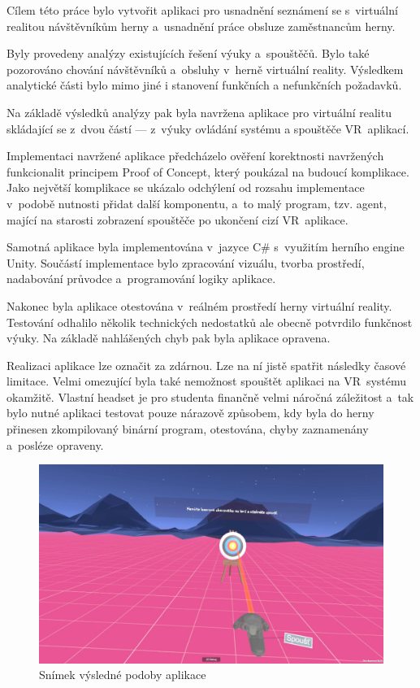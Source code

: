 Cílem této práce bylo vytvořit aplikaci pro usnadnění seznámení se
s~virtuální realitou návštěvníkům herny a~usnadnění práce obsluze zaměstnancům herny.

Byly provedeny analýzy existujících řešení výuky a~spouštěčů. Bylo také
pozorováno chování návštěvníků a~obsluhy v~herně virtuální reality.
Výsledkem analytické části bylo mimo jiné i stanovení funkčních a
nefunkčních požadavků.

Na základě výsledků analýzy pak byla navržena aplikace pro virtuální
realitu skládající se z~dvou částí --- z~výuky ovládání systému a
spouštěče VR~aplikací.

Implementaci navržené aplikace předcházelo ověření korektnosti
navržených funkcionalit principem Proof of Concept, který poukázal na
budoucí komplikace. Jako největší komplikace se ukázalo odchýlení od
rozsahu implementace v~podobě nutnosti přidat další komponentu, a~to
malý program, tzv. agent, mající na starosti zobrazení spouštěče po
ukončení cizí VR~aplikace.

Samotná aplikace byla implementována v~jazyce C\# s~využitím herního
engine Unity. Součástí implementace bylo zpracování vizuálu, tvorba
prostředí, nadabování průvodce a~programování logiky aplikace.

Nakonec byla aplikace otestována v~reálném prostředí herny virtuální
reality. Testování odhalilo několik technických nedostatků ale obecně
potvrdilo funkčnost výuky. Na základě nahlášených chyb pak byla aplikace
opravena.

Realizaci aplikace lze označit za zdárnou. Lze na ní jistě spatřit
následky časové limitace. Velmi omezující byla také nemožnost spouštět
aplikaci na VR~systému okamžitě. Vlastní headset je pro studenta
finančně velmi náročná záležitost a~tak bylo nutné aplikaci testovat
pouze nárazově způsobem, kdy byla do herny přinesen zkompilovaný
binární program, otestována, chyby zaznamenány a~posléze opraveny.

\begin{figure}[h!]
\centering
\includegraphics[width=12cm]{src/assets/result.png}
\caption{Snímek výsledné podoby aplikace}
\end{figure}

